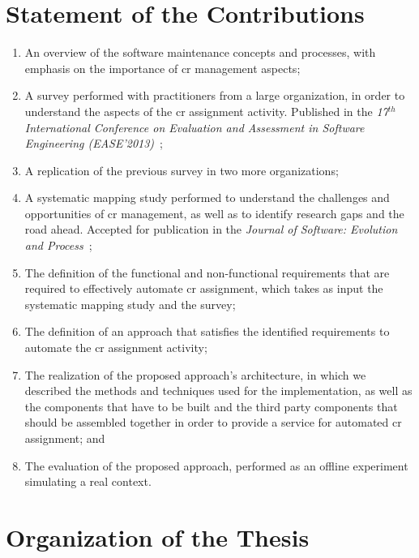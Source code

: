 \section{Statement of the Contributions}
\lipsum[6-7]

\begin{enumerate}
  \item An overview of the software maintenance concepts and processes, with
  emphasis on the importance of \ac{cr} management aspects;
  \item A survey performed with practitioners from a large organization, in
  order to understand the aspects of the \ac{cr} assignment
  activity. Published in the \emph{17$^{th}$ International Conference on Evaluation
  and Assessment in Software Engineering (EASE'2013)}~\citep{CavalcantiEASE2013};
  \item A replication of the previous survey in two more organizations;
  \item A systematic mapping study performed to understand the challenges and
  opportunities of \ac{cr} management, as well as to identify research gaps and
  the road ahead. Accepted for publication in the
  \emph{Journal of Software: Evolution and Process}~\citep{CavalcantiJSEP2013};
  \item The definition of the functional and non-functional requirements that
  are required to effectively automate \ac{cr} assignment, which takes as input
  the systematic mapping study and the survey;
  \item The definition of an approach that satisfies the
  identified requirements to automate the \ac{cr} assignment activity;
  \item The realization of the proposed approach's architecture, in which we
  described the methods and techniques used for the implementation, as well as the
  components that have to be built and the third party components that should be
  assembled together in order to provide a service for automated \ac{cr}
  assignment; and
  \item The evaluation of the proposed approach, performed as an offline
  experiment simulating a real context.
\end{enumerate}

\section{Organization of the Thesis}

\lipsum[5-10]
